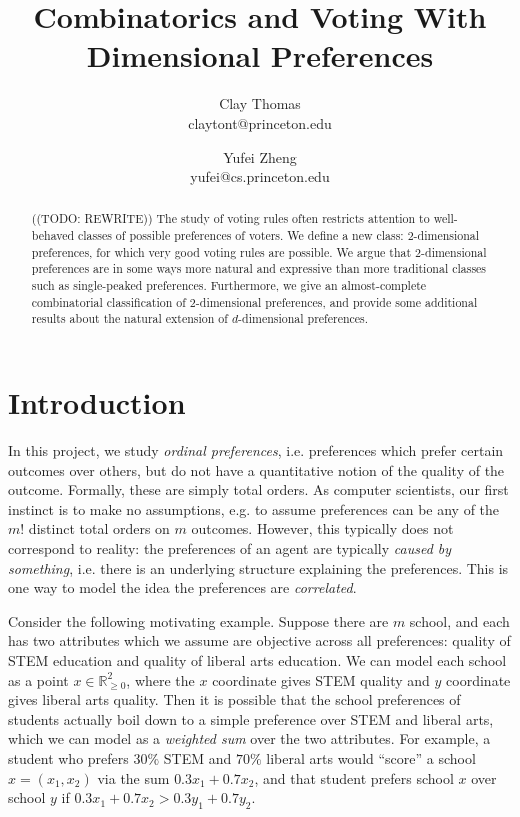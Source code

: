 \documentclass[12pt]{article}
\newcommand{\Rgz}{\mathbb{R}_{\ge 0}}
\newcommand{\1}[1]{\mathds{1}[{#1}]}
\begin{document}
 
\title{
  Combinatorics and Voting With Dimensional Preferences
}
\author{
  Clay Thomas \\
  claytont@princeton.edu
\and
  Yufei Zheng\\
  yufei@cs.princeton.edu
}

\maketitle
\begin{abstract}
  ((TODO: REWRITE))
  The study of voting rules often restricts attention to
  well-behaved classes of possible preferences of voters.
  We define a new class: $2$-dimensional preferences,
  for which very good voting rules are possible.
  We argue that $2$-dimensional preferences are in some ways
  more natural and expressive than more traditional classes
  such as single-peaked preferences.
  Furthermore, we give an almost-complete combinatorial classification
  of $2$-dimensional preferences, and provide some additional
  results about the natural extension of $d$-dimensional preferences.
\end{abstract}

\section{Introduction}

  In this project, we study \emph{ordinal preferences}, i.e. preferences which
  prefer certain outcomes over others, but do not have a quantitative notion of
  the quality of the outcome. Formally, these are simply total orders.
  As computer scientists, our first instinct is to make no assumptions,
  e.g. to assume preferences can be any of the $m!$ distinct total orders
  on $m$ outcomes.
  However, this typically does not correspond to reality: the preferences of an
  agent are typically \emph{caused by something}, i.e. there is an underlying
  structure explaining the preferences. This is one way to model the idea the
  preferences are \emph{correlated}.

  Consider the following motivating example.
  Suppose there are $m$ school, and each has two attributes
  which we assume are objective across all preferences:
  quality of STEM education and quality of liberal arts education.
  We can model each school as a point $x\in \Rgz^2$, where the $x$ coordinate
  gives STEM quality and $y$ coordinate gives liberal arts quality.
  Then it is possible that the school preferences of students
  actually boil down to a simple preference over STEM and liberal arts,
  which we can model as a \emph{weighted sum} over the two attributes.
  For example, a student who prefers $30\%$ STEM and $70\%$ liberal arts
  would ``score'' a school $x = (x_1, x_2)$ via the sum
  $0.3 x_1 + 0.7 x_2$, and that student prefers school $x$ over school $y$
  if $0.3 x_1 + 0.7 x_2 > 0.3 y_1 + 0.7 y_2$.
\end{document}
